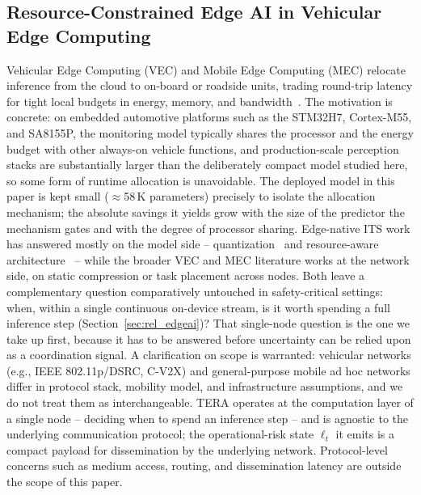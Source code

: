 \documentclass[a4paper,fleqn]{cas-dc}
\begin{document}
\subsection{Resource-Constrained Edge AI in Vehicular Edge Computing}
\label{sec:rel_vec}
Vehicular Edge Computing (VEC) and Mobile Edge Computing (MEC) relocate inference
from the cloud to on-board or roadside units, trading round-trip latency for tight
local budgets in energy, memory, and bandwidth~\cite{gill2025edgeai,bouhsissin2023driver,ortega2020dmd}.
The motivation is concrete: on embedded automotive platforms such as the
STM32H7, Cortex-M55, and SA8155P, the monitoring model typically shares the
processor and the energy budget with other always-on vehicle functions, and
production-scale perception stacks are substantially larger than the
deliberately compact model studied here, so some form of runtime allocation is
unavoidable. {\color{\revcolor}The deployed model in this paper is kept small
($\approx$58\,K parameters) precisely to isolate the allocation mechanism; the
absolute savings it yields grow with the size of the predictor the mechanism
gates and with the degree of processor sharing.} Edge-native ITS work has answered mostly
on the model side -- quantization~\cite{hariharan2023driveredge} and resource-aware
architecture~\cite{almodhwahi2025facial} -- while the broader VEC and MEC literature
works at the network side, on static compression or task placement across nodes.
Both leave a complementary question comparatively untouched in safety-critical
settings: when, within a single continuous on-device stream, is it worth
spending a full inference step (Section~\ref{sec:rel_edgeai})? That single-node
question is the one we take up first, because it has to be answered before
uncertainty can be relied upon as a coordination signal.
{\color{\revcolor}A clarification on scope is warranted: vehicular networks (e.g.,
IEEE 802.11p/DSRC, C-V2X) and general-purpose mobile ad hoc networks differ in
protocol stack, mobility model, and infrastructure assumptions, and we do not
treat them as interchangeable. TERA operates at the computation layer
of a single node -- deciding when to spend an inference step -- and is
agnostic to the underlying communication protocol; the operational-risk state
$\ell_t$ it emits is a compact payload for dissemination by the underlying
network. Protocol-level concerns such as medium access, routing, and
dissemination latency are outside the scope of this paper.}
\end{document}
